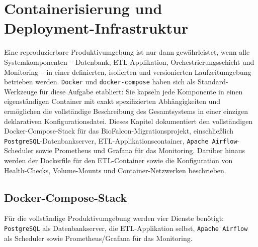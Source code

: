 ﻿\documentclass[12pt,a4paper]{report}
\theoremstyle{definition}
\theoremstyle{remark}
\newcommand{\pg}{\texttt{PostgreSQL}}
\newcommand{\airflow}{\texttt{Apache Airflow}}
\newcommand{\docker}{\texttt{Docker}}
\newcommand{\code}[1]{\texttt{#1}}
\begin{document}
\chapter{Containerisierung und Deployment-Infrastruktur}
\label{sec:docker}

Eine reproduzierbare Produktivumgebung ist nur dann gewährleistet, wenn alle Systemkomponenten -- Datenbank, ETL-Applikation, Orchestrierungsschicht und Monitoring -- in einer definierten, isolierten und versionierten Laufzeitumgebung betrieben werden. \docker{} und \code{docker-compose} haben sich als Standard-Werkzeuge für diese Aufgabe etabliert: Sie kapseln jede Komponente in einen eigenständigen Container mit exakt spezifizierten Abhängigkeiten und ermöglichen die vollständige Beschreibung des Gesamtsystems in einer einzigen deklarativen Konfigurationsdatei. Dieses Kapitel dokumentiert den vollständigen Docker-Compose-Stack für das BioFalcon-Migrationsprojekt, einschließlich \pg{}-Datenbankserver, ETL-Applikationscontainer, \airflow{}-Scheduler sowie Prometheus und Grafana für das Monitoring. Darüber hinaus werden der Dockerfile für den ETL-Container sowie die Konfiguration von Health-Checks, Volume-Mounts und Container-Netzwerken beschrieben.

\section{Docker-Compose-Stack}

Für die vollständige Produktivumgebung werden vier Dienste ben\"otigt:
\pg{} als Datenbankserver, die ETL-Applikation selbst, \airflow{}
als Scheduler sowie Prometheus/Grafana für das Monitoring.
\end{document}
